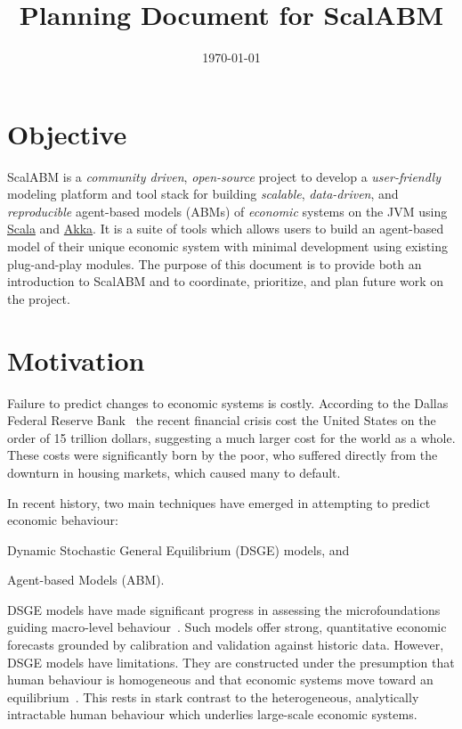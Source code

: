 \documentclass[a4paper]{article}
\title{Planning Document for ScalABM}
\date{\today}
\begin{document}
\maketitle

\section{Objective}

ScalABM is a \textit{community driven}, \textit{open-source} project to develop a \textit{user-friendly} modeling platform and tool stack for building \textit{scalable}, \textit{data-driven}, and \textit{reproducible} agent-based models (ABMs) of \textit{economic} systems on the JVM using \href{http://www.scala-lang.org/}{Scala} and \href{http://akka.io/}{Akka}. It is a suite of tools which allows users to build an agent-based model of their unique economic system with minimal development using existing plug-and-play modules. The purpose of this document is to provide both an introduction to ScalABM and to coordinate, prioritize, and plan future work on the project. 

\section{Motivation}

Failure to predict changes to economic systems is costly. According to the Dallas Federal Reserve Bank~\citep{Luttrell2013Costs} the recent financial crisis cost the United States on the order of 15 trillion dollars, suggesting a much larger cost for the world as a whole. These costs were significantly
born by the poor, who suffered directly from the downturn in housing markets, which caused many to default.

In recent history, two main techniques have emerged in attempting to predict economic behaviour:\begin{inparaenum}[a.)]
\item Dynamic Stochastic General Equilibrium (DSGE) models, and 
\item Agent-based Models (ABM).
\end{inparaenum} DSGE models have made significant progress in assessing the microfoundations guiding macro-level behaviour~\citep{Smets2003,Sungbae2007BaysianDSGE}. Such models offer strong, quantitative economic forecasts grounded by calibration and validation against historic data. However, DSGE models have limitations. They are constructed under the presumption that human behaviour is homogeneous and that economic systems move toward an equilibrium~\citep{Farmer2009NeedABM}. This rests in stark contrast to the heterogeneous, analytically intractable human behaviour which underlies large-scale economic systems.
\end{document}
